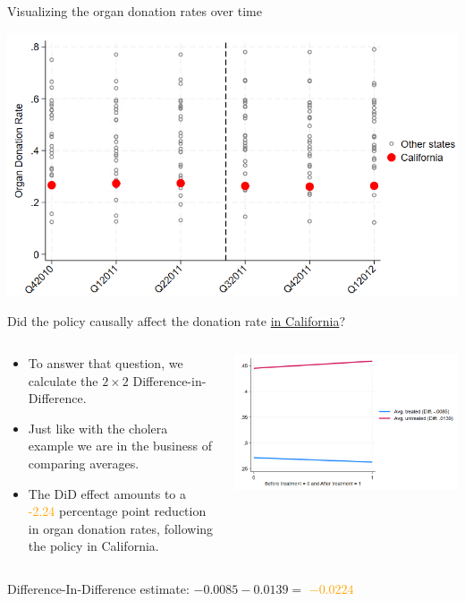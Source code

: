 \documentclass[notes,11pt, aspectratio=169]{beamer}
\begin{document}
\begin{frame}{Visualizing the organ donation rates over time}
 \begin{center}
        \includegraphics[width=0.7\linewidth]{24_DiDLecture/24_DiDLecture_PlotAll.png}
    \end{center}
\end{frame}


\begin{frame}{Did the policy causally affect the donation rate 
\underline{in California}?}
\begin{columns}
\begin{column}{0.5\textwidth}
\begin{itemize}
    \item To answer that question, we calculate the $2\times2$ Difference-in-Difference.
    \item Just like with the cholera example we are in the business of comparing averages.
    \item The DiD effect amounts to a  \textcolor{orange}{-2.24} percentage point reduction in organ donation rates, following the policy in California.
\end{itemize}
\end{column}

\begin{column}{0.5\textwidth}
 \begin{center}
        \includegraphics[width=1\linewidth]{24_DiDLecture/24_DiDLecture_DiD2x2Plot.png}
    \end{center}
\end{column}
\end{columns}
    \flushright
    \vspace{1cm}
    Difference-In-Difference estimate: $-0.0085 - 0.0139 =$   \textcolor{orange}{$ -0.0224$}
\end{frame}
\end{document}
